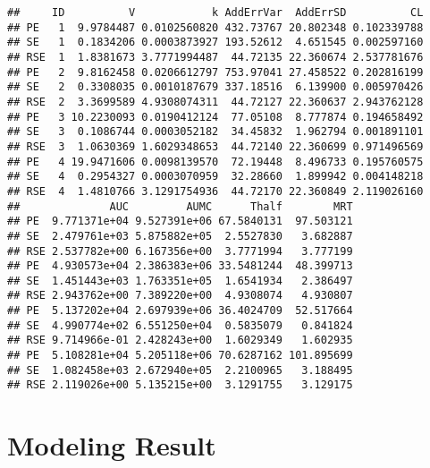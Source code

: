 \documentclass[9pt,]{krantz}
\begin{document}
\begin{verbatim}
##     ID          V            k AddErrVar  AddErrSD          CL
## PE   1  9.9784487 0.0102560820 432.73767 20.802348 0.102339788
## SE   1  0.1834206 0.0003873927 193.52612  4.651545 0.002597160
## RSE  1  1.8381673 3.7771994487  44.72135 22.360674 2.537781676
## PE   2  9.8162458 0.0206612797 753.97041 27.458522 0.202816199
## SE   2  0.3308035 0.0010187679 337.18516  6.139900 0.005970426
## RSE  2  3.3699589 4.9308074311  44.72127 22.360637 2.943762128
## PE   3 10.2230093 0.0190412124  77.05108  8.777874 0.194658492
## SE   3  0.1086744 0.0003052182  34.45832  1.962794 0.001891101
## RSE  3  1.0630369 1.6029348653  44.72140 22.360699 0.971496569
## PE   4 19.9471606 0.0098139570  72.19448  8.496733 0.195760575
## SE   4  0.2954327 0.0003070959  32.28660  1.899942 0.004148218
## RSE  4  1.4810766 3.1291754936  44.72170 22.360849 2.119026160
##              AUC         AUMC      Thalf        MRT
## PE  9.771371e+04 9.527391e+06 67.5840131  97.503121
## SE  2.479761e+03 5.875882e+05  2.5527830   3.682887
## RSE 2.537782e+00 6.167356e+00  3.7771994   3.777199
## PE  4.930573e+04 2.386383e+06 33.5481244  48.399713
## SE  1.451443e+03 1.763351e+05  1.6541934   2.386497
## RSE 2.943762e+00 7.389220e+00  4.9308074   4.930807
## PE  5.137202e+04 2.697939e+06 36.4024709  52.517664
## SE  4.990774e+02 6.551250e+04  0.5835079   0.841824
## RSE 9.714966e-01 2.428243e+00  1.6029349   1.602935
## PE  5.108281e+04 5.205118e+06 70.6287162 101.895699
## SE  1.082458e+03 2.672940e+05  2.2100965   3.188495
## RSE 2.119026e+00 5.135215e+00  3.1291755   3.129175
\end{verbatim}

\section{Modeling Result}\label{modeling-result-1}
\end{document}
